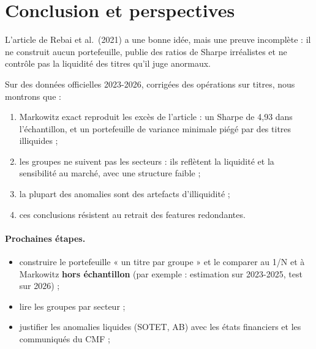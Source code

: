 \documentclass[11pt,a4paper]{article}
\begin{document}
\section*{Conclusion et perspectives}
L'article de Rebai et al.\ (2021) a une bonne idée, mais une preuve incomplète : il ne construit aucun portefeuille, publie des ratios de Sharpe irréalistes et ne contrôle pas la liquidité des titres qu'il juge anormaux.

Sur des données officielles 2023-2026, corrigées des opérations sur titres, nous montrons que :
\begin{enumerate}
  \item Markowitz exact reproduit les excès de l'article : un Sharpe de 4,93 dans l'échantillon, et un portefeuille de variance minimale piégé par des titres illiquides ;
  \item les groupes ne suivent pas les secteurs : ils reflètent la liquidité et la sensibilité au marché, avec une structure faible ;
  \item la plupart des anomalies sont des artefacts d'illiquidité ;
  \item ces conclusions résistent au retrait des features redondantes.
\end{enumerate}

\paragraph{Prochaines étapes.}
\begin{itemize}
  \item construire le portefeuille « un titre par groupe » et le comparer au 1/N et à Markowitz \textbf{hors échantillon} (par exemple : estimation sur 2023-2025, test sur 2026) ;
  \item lire les groupes par secteur ;
  \item justifier les anomalies liquides (SOTET, AB) avec les états financiers et les communiqués du CMF ;
\end{itemize}

\clearpage
\end{document}
